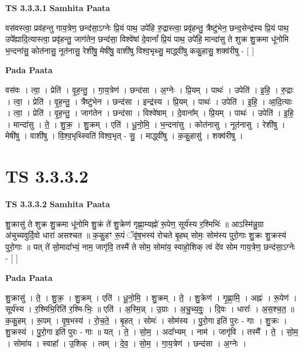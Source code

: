 \documentclass[17pt]{extarticle}
\begin{document}
\textbf{TS 3.3.3.1 } \newline
\textbf{Samhita Paata} \newline

वस॑वस्त्वा॒ प्रव॑हन्तु गाय॒त्रेण॒ छन्द॑सा॒ऽग्नेः प्रि॒यं पाथ॒ उपे॑हि रु॒द्रास्त्वा॒ प्रवृ॑हन्तु॒ त्रैष्टु॑भेन॒ छन्द॒सेन्द्र॑स्य प्रि॒यं पाथ॒ उपे᳚ह्यादि॒त्यास्त्वा॒ प्रवृ॑हन्तु॒ जाग॑तेन॒ छन्द॑सा॒ विश्वे॑षां दे॒वानां᳚ प्रि॒यं पाथ॒ उपे॑हि॒ मान्दा॑सु ते शुक्र शु॒क्रमा धू॑नोमि भ॒न्दना॑सु॒ कोत॑नासु॒ नूत॑नासु॒ रेशी॑षु॒ मेषी॑षु॒ वाशी॑षु विश्व॒भृथ्सु॒ माद्ध्वी॑षु ककु॒हासु॒ शक्व॑रीषु - [  ] \newline

\textbf{Pada Paata} \newline

वस॑वः । त्वा॒ । प्रेति॑ । वृ॒ह॒न्तु॒ । गा॒य॒त्रेण॑ । छन्द॑सा । अ॒ग्नेः । प्रि॒यम् । पाथः॑ । उपेति॑ । इ॒हि॒ । रु॒द्राः । त्वा॒ । प्रेति॑ । वृ॒ह॒न्तु॒ । त्रैष्टु॑भेन । छन्द॑सा । इन्द्र॑स्य । प्रि॒यम् । पाथः॑ । उपेति॑ । इ॒हि॒ । आ॒दि॒त्याः । त्वा॒ । प्रेति॑ । वृ॒ह॒न्तु॒ । जाग॑तेन । छन्द॑सा । विश्वे॑षाम् । दे॒वाना᳚म् । प्रि॒यम् । पाथः॑ । उपेति॑ । इ॒हि॒ । मान्दा॑सु । ते॒ । शु॒क्र॒ । शु॒क्रम् । एति॑ । धू॒नो॒मि॒ । भ॒न्दना॑सु । कोत॑नासु । नूत॑नासु । रेशी॑षु । मेषी॑षु । वाशी॑षु । वि॒श्व॒भृथ्स्विति॑ विश्व॒भृत् - सु॒ । माद्ध्वी॑षु । क॒कु॒हासु॑ । शक्व॑रीषु ।  \newline




\section*{ TS 3.3.3.2 }

\textbf{TS 3.3.3.2 } \newline
\textbf{Samhita Paata} \newline

शु॒क्रासु॑ ते शुक्र शु॒क्रमा धू॑नोमि शु॒क्रं ते॑ शु॒क्रेण॑ गृह्णा॒म्यह्नो॑ रू॒पेण॒ सूर्य॑स्य र॒श्मिभिः॑ ॥ आऽस्मि॑न्नु॒ग्रा अ॑चुच्यवुर्दि॒वो धारा॑ असश्चत ॥ क॒कु॒हꣳ रू॒पं ॅवृ॑ष॒भस्य॑ रोचते बृ॒हथ् सोमः॒ सोम॑स्य पुरो॒गाः शु॒क्रः शु॒क्रस्य॑ पुरो॒गाः ॥ यत् ते॑ सो॒मादा᳚भ्यं॒ नाम॒ जागृ॑वि॒ तस्मै॑ ते सोम॒ सोमा॑य॒ स्वाहो॒शिक् त्वं दे॑व सोम गाय॒त्रेण॒ छन्द॑सा॒ऽग्नेः - [  ] \newline

\textbf{Pada Paata} \newline

शु॒क्रासु॑ । ते॒ । शु॒क्र॒ । शु॒क्रम् । एति॑ । धू॒नो॒मि॒ । शु॒क्रम् । ते॒ । शु॒क्रेण॑ । गृ॒ह्णा॒मि॒ । अह्नः॑ । रू॒पेण॑ । सूर्य॑स्य । र॒श्मिभि॒रिति॑ र॒श्मि-भिः॒ ॥ एति॑ । अ॒स्मि॒न्न् । उ॒ग्राः । अ॒चु॒च्य॒वुः॒ । दि॒वः । धाराः᳚ । अ॒स॒श्च॒त॒ ॥ क॒कु॒हम् । रू॒पम् । वृ॒ष॒भस्य॑ । रो॒च॒ते॒ । बृ॒हत् । सोमः॑ । सोम॑स्य । पु॒रो॒गा इति॑ पुरः - गाः । शु॒क्रः । शु॒क्रस्य॑ । पु॒रो॒गा इति॑ पुरः - गाः ॥ यत् । ते॒ । सो॒म॒ । अदा᳚भ्यम् । नाम॑ । जागृ॑वि । तस्मै᳚ । ते॒ । सो॒म॒ । सोमा॑य । स्वाहा᳚ । उ॒शिक् । त्वम् । दे॒व॒ । सो॒म॒ । गा॒य॒त्रेण॑ । छन्द॑सा । अ॒ग्नेः ।  \newline
\end{document}
